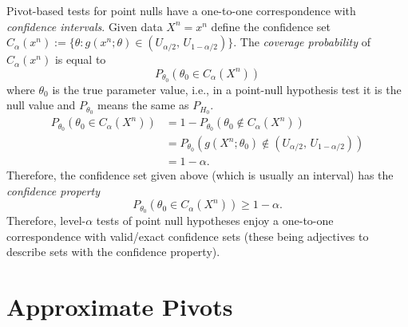 \documentclass[
]{book}
\theoremstyle{definition}
\theoremstyle{definition}
\theoremstyle{definition}
\theoremstyle{definition}
\theoremstyle{remark}
\begin{document}
Pivot-based tests for point nulls have a one-to-one correspondence with \emph{confidence intervals}. Given data \(X^n = x^n\) define the confidence set \(C_{\alpha}(x^n):=\{\theta: g(x^n;\theta)\in(U_{\alpha/2}, \, U_{1-\alpha/2})\}\). The \emph{coverage probability} of \(C_\alpha(x^n)\) is equal to
\[P_{\theta_0}(\theta_0 \in C_\alpha(X^n))\]
where \(\theta_0\) is the true parameter value, i.e., in a point-null hypothesis test it is the null value and \(P_{\theta_0}\) means the same as \(P_{H_0}\).\\
\begin{align*} 
P_{\theta_0}(\theta_0 \in C_\alpha(X^n)) &= 1-P_{\theta_0}(\theta_0 \notin C_\alpha(X^n))\\
& = P_{\theta_0}(g(X^n;\theta_0)\notin(U_{\alpha/2}, \, U_{1-\alpha/2}))\\
& = 1-\alpha.
\end{align*}
Therefore, the confidence set given above (which is usually an interval) has the \emph{confidence property}
\[P_{\theta_0}(\theta_0 \in C_\alpha(X^n))\geq 1-\alpha.\]
Therefore, level-\(\alpha\) tests of point null hypotheses enjoy a one-to-one correspondence with valid/exact confidence sets (these being adjectives to describe sets with the confidence property).

\hypertarget{approximate-pivots}{%
\section{Approximate Pivots}\label{approximate-pivots}}
\end{document}
